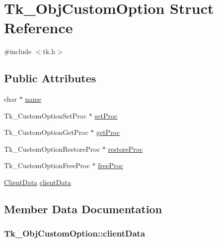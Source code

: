 \hypertarget{struct_tk___obj_custom_option}{}\section{Tk\+\_\+\+Obj\+Custom\+Option Struct Reference}
\label{struct_tk___obj_custom_option}


{\ttfamily \#include $<$tk.\+h$>$}

\subsection*{Public Attributes}
\begin{DoxyCompactItemize}
\item 
char $\ast$ \hyperlink{struct_tk___obj_custom_option_abe94a301d88cda5613d3b0ae1f833bb8}{name}
\item 
Tk\+\_\+\+Custom\+Option\+Set\+Proc $\ast$ \hyperlink{struct_tk___obj_custom_option_a0b8c5efcf6191f3ff9d1b0da30a35a9e}{set\+Proc}
\item 
Tk\+\_\+\+Custom\+Option\+Get\+Proc $\ast$ \hyperlink{struct_tk___obj_custom_option_a0c79eb691380bc360eb088fb372aed6e}{get\+Proc}
\item 
Tk\+\_\+\+Custom\+Option\+Restore\+Proc $\ast$ \hyperlink{struct_tk___obj_custom_option_ac506ef6f955f558df4bd86c14d2aac87}{restore\+Proc}
\item 
Tk\+\_\+\+Custom\+Option\+Free\+Proc $\ast$ \hyperlink{struct_tk___obj_custom_option_a68329c7127ecd0dc11d7bbfbbae930cd}{free\+Proc}
\item 
\hyperlink{tk_8h_accf84b4d725a8f41e04d6333768a6001}{Client\+Data} \hyperlink{struct_tk___obj_custom_option_a1827541a10491504ec689163be1910af}{client\+Data}
\end{DoxyCompactItemize}


\subsection{Member Data Documentation}
\subsubsection[{\texorpdfstring{client\+Data}{clientData}}]{ Tk\+\_\+\+Obj\+Custom\+Option\+::client\+Data}\hypertarget{struct_tk___obj_custom_option_a1827541a10491504ec689163be1910af}{}\label{struct_tk___obj_custom_option_a1827541a10491504ec689163be1910af}
